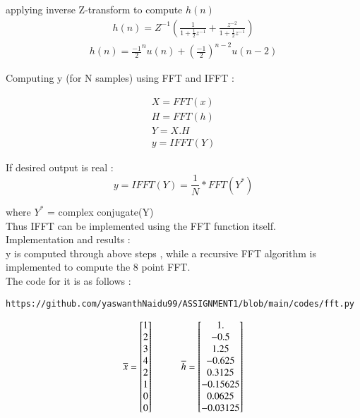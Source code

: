 \documentclass[journal,12pt,twocolumn]{IEEEtran}
\begin{document}
applying inverse Z-transform to compute $h(n)$
\begin{align}
 h(n)= Z^{-1}\left( {\frac{1}{1+\frac{1}{2}z^{-1}} + \frac{z^{-2}}{1+\frac{1}{2}z^{-1}}} \right)
\end{align}
\begin{align}
 h(n)={\frac{-1}{2}}^nu(n) + \left({\frac{-1}{2}}\right)^{n-2}u(n-2)
\end{align}

Computing y (for N samples) using FFT and IFFT : 

\begin{align}
X = FFT(x)\\
H = FFT(h)\\
Y = X.H\\
y = IFFT(Y)
\end{align}


If desired output is real : 
\begin{equation}
    y = IFFT(Y) = \frac{1}{N}*FFT(Y^{*})
\end{equation}

where $Y^{*}$ = complex conjugate(Y)\\
Thus IFFT can be implemented using the FFT function itself.\\

Implementation and results : \\
y is computed through above steps , while a recursive FFT algorithm is implemented to compute the 8 point FFT.\\
The code for it is as follows :
\begin{lstlisting}
https://github.com/yaswanthNaidu99/ASSIGNMENT1/blob/main/codes/fft.py
\end{lstlisting}

\begin{equation}
\overline{x} =
\begin{bmatrix}
1\\2\\3\\4\\2\\1\\0\\0
\end{bmatrix} \hspace{10mm} 
\overline{h} =
\begin{bmatrix}
1. \\     -0.5 \\     1.25 \\   -0.625 \\   0.3125 \\ -0.15625 \\ 0.0625\\  -0.03125
\end{bmatrix}
\end{equation}
\end{document}
